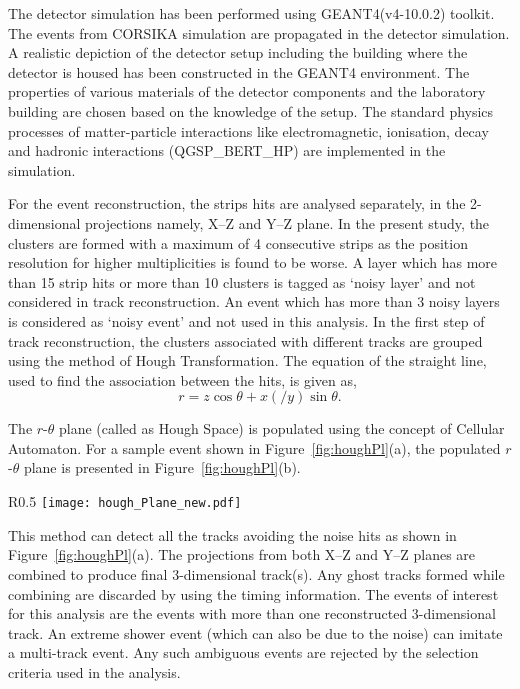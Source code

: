 The detector simulation has been performed using GEANT4(v4-10.0.2) toolkit. The events from CORSIKA simulation are propagated in the detector simulation. A realistic depiction of the detector setup including the building where the detector is housed has been constructed in the GEANT4 environment. The properties of various materials of the detector components and the laboratory building are chosen based on the knowledge of the setup. The standard physics processes of matter-particle interactions like electromagnetic, ionisation, decay and hadronic interactions (QGSP\_BERT\_HP) are implemented in the simulation.

For the event reconstruction, the strips hits are analysed separately, in the 2-dimensional projections namely, \mbox{X--Z} and \mbox{Y--Z} plane. In the present study, the clusters are formed with a maximum of 4 consecutive strips as the position resolution for higher multiplicities is found to be worse. A layer which has more than 15 strip hits or more than 10 clusters is tagged as `noisy layer' and not considered in track reconstruction. An event which has more than 3 noisy layers is considered as `noisy event' and not used in this analysis. In the first step of track reconstruction, the clusters associated with different tracks are grouped using the method of Hough Transformation\cite{hought}. The equation of the straight line, used to find the association between the hits, is given as,
\begin{equation}
  r=z\cos\theta+x\left(/y\right)\sin\theta. \label{eq:hough}
\end{equation}

The \mbox{$r$-$\theta$} plane (called as Hough Space) is populated using the concept of Cellular Automaton\cite{cellular}. For a sample event shown in Figure~\ref{fig:houghPl}(a), the populated \mbox{$r$-$\theta$} plane is presented in Figure~\ref{fig:houghPl}(b). 
\begin{wrapfigure}{R}{0.5\textwidth}
  \centering
  \texttt{[image: hough\_Plane\_new.pdf]} 
  \caption{(a) Projection of an event in the detector and (b) populated $r$-$\theta$~plane using this event.}
  \label{fig:houghPl}
\end{wrapfigure}
This method can detect all the tracks avoiding the noise hits as shown in Figure~\ref{fig:houghPl}(a). The projections from both X--Z and Y--Z planes are combined to produce final 3-dimensional track(s). Any ghost tracks formed while combining are discarded by using the timing information. The events of interest for this analysis are the events with more than one reconstructed 3-dimensional track. An extreme shower event (which can also be due to the noise) can imitate a multi-track event. Any such ambiguous events are rejected by the selection criteria used in the analysis.

